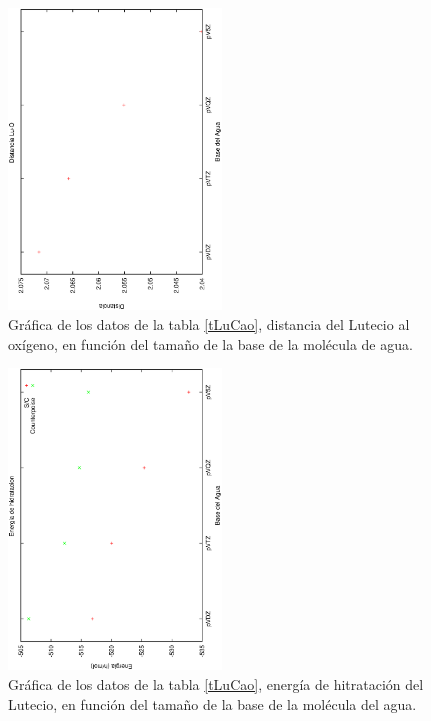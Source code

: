 \begin{figure}[h]
\centering
\includegraphics[height=8cm,angle=-90]{../Tablas/luCdist.ps}
\caption{\small{Gr\'afica de los datos de la tabla \ref{tLuCao},
distancia del Lutecio al ox\'igeno, en funci\'on del tama\~no
de la base de la mol\'ecula de agua.}}
\label{fLuCD}
\end{figure}
\begin{figure}[h]
\centering
\includegraphics[height=8cm,angle=-90]{../Tablas/luCeneh.ps}
\caption{\small{Gr\'afica de los datos de la tabla \ref{tLuCao},
energ\'ia de hitrataci\'on del Lutecio, en funci\'on del tama\~no
de la base de la mol\'ecula del agua.}}
\label{fLuCE}
\end{figure}


